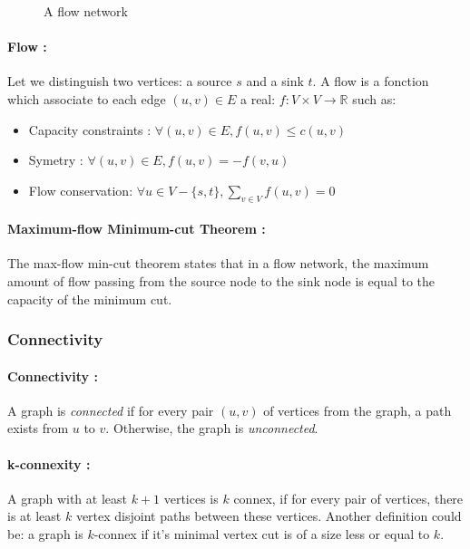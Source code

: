\begin{figure}[!h]
  \begin{center}
    
  \end{center}
  \caption{A flow network}
\end{figure}

\paragraph{Flow :}
Let we distinguish two vertices: a source $s$ and a sink $t$.
A flow is a fonction which associate to each edge $(u,v) \in E$ a real:
$f: V \times V \rightarrow \mathbb{R}$ such as:
\begin{itemize}
    \item Capacity constraints : $\forall (u,v) \in E, f(u,v) \leq c(u,v)$
    \item Symetry : $\forall (u,v) \in E, f(u,v) = - f(v,u) $
    \item Flow conservation: $\forall u \in V - \{s,t\}, \sum_{v \in V}f(u,v) = 0$ 
\end{itemize}


\paragraph{Maximum-flow Minimum-cut Theorem :}
The max-flow min-cut theorem states that in a flow network, the maximum amount
of flow passing from the source node to the sink node is equal to the capacity
of the minimum cut.


\subsubsection{Connectivity}
\paragraph{Connectivity :}\label{defConnectivity}
A graph is {\em connected} if for every pair $(u,v)$ of vertices from the
graph, a path exists from $u$ to $v$. Otherwise, the graph is {\em unconnected}.

\paragraph{k-connexity :}
A graph with at least $k+1$ vertices is $k$ connex, if for every pair of
vertices, there is at least $k$ vertex disjoint paths between these vertices.
Another definition could be: a graph is $k$-connex if it's minimal vertex cut
is of a size less or equal to $k$.

